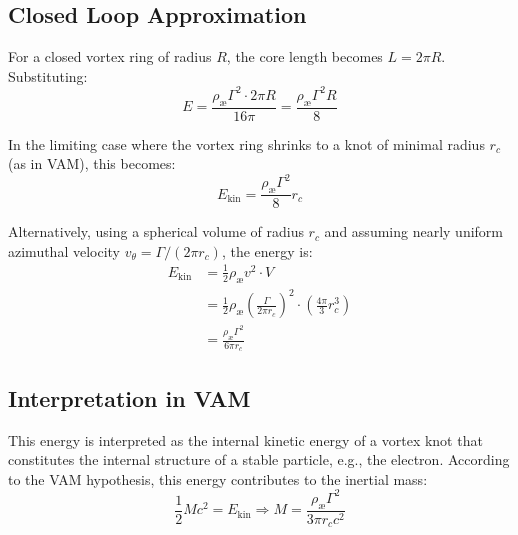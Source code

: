 \subsection{Closed Loop Approximation}
For a closed vortex ring of radius $R$, the core length becomes $L = 2\pi R$. Substituting:
\begin{equation}
    E = \frac{\rho_\text{\ae} \Gamma^2 \cdot 2\pi R}{16\pi} = \frac{\rho_\text{\ae} \Gamma^2 R}{8}
\end{equation}

In the limiting case where the vortex ring shrinks to a knot of minimal radius $r_c$ (as in VAM), this becomes:
\begin{equation}
    E_\text{kin} = \frac{\rho_\text{\ae} \Gamma^2}{8} r_c
\end{equation}

Alternatively, using a spherical volume of radius $r_c$ and assuming nearly uniform azimuthal velocity $v_\theta = \Gamma / (2\pi r_c)$, the energy is:
\begin{align}
    E_\text{kin} &= \frac{1}{2} \rho_\text{\ae} v^2 \cdot V \\
    &= \frac{1}{2} \rho_\text{\ae} \left( \frac{\Gamma}{2\pi r_c} \right)^2 \cdot \left( \frac{4\pi}{3} r_c^3 \right) \\
    &= \boxed{\frac{\rho_\text{\ae} \Gamma^2}{6\pi r_c}}
\end{align}

\subsection{Interpretation in VAM}
This energy is interpreted as the internal kinetic energy of a vortex knot that constitutes the internal structure of a stable particle, e.g., the electron. According to the VAM hypothesis, this energy contributes to the inertial mass:
\begin{equation}
    \frac{1}{2} M c^2 = E_\text{kin} \Rightarrow M = \frac{\rho_\text{\ae} \Gamma^2}{3\pi r_c c^2}
\end{equation}


